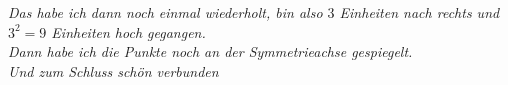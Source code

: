 \documentclass{article}
\begin{document}
\begin{minipage}[t]{.5\textwidth}
\raggedright
\vspace{0.5cm}



\emph{\color{red!80!black} Das habe ich dann noch einmal wiederholt, bin also $3$ Einheiten nach rechts und $3^2 = 9$ Einheiten hoch gegangen.}\\[6cm]
\emph{Dann habe ich die Punkte noch an der Symmetrieachse gespiegelt.}\\[6cm]
\emph{Und zum Schluss schön verbunden}\\





\end{minipage}%
\begin{minipage}[t]{.05\textwidth}
\hfill\\
\end{minipage}%
\end{document}
